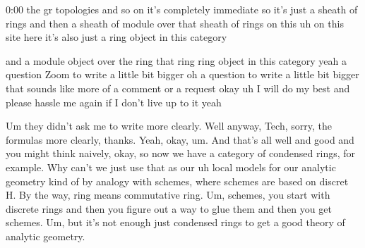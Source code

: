 \begin{unfinished}{0:00}
the gr topologies and so on it's completely immediate so it's just a sheath of rings and then a sheath of module over that sheath of rings on this uh on this site here it's also just a ring object in this category

 and a module object over the ring that ring ring object in this category yeah a question Zoom to write a little bit bigger oh a question to write a little bit bigger that sounds like more of a comment or a request okay uh I will do my best and please hassle me again if I don't live up to it yeah

Um they didn't ask me to write more clearly. Well anyway, Tech, sorry, the formulas more clearly, thanks. Yeah, okay, um. And that's all well and good and you might think naively, okay, so now we have a category of condensed rings, for example. Why can't we just use that as our uh local models for our analytic geometry kind of by analogy with schemes, where schemes are based on discret H. By the way, ring means commutative ring. Um, schemes, you start with discrete rings and then you figure out a way to glue them and then you get schemes. Um, but it's not enough just condensed rings to get a good theory of analytic geometry.


\end{unfinished}
